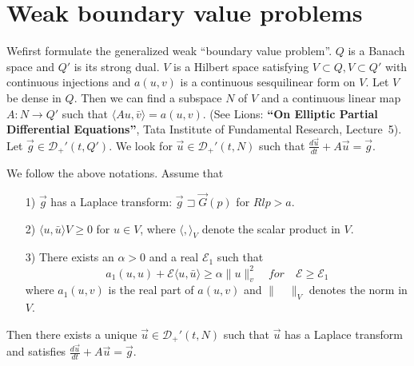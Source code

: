 
\chapter{Weak boundary value problems}\label{chap11}

\noindent We\pageoriginale first formulate the generalized weak
``boundary value problem''.
 $Q$ is a Banach space and $Q'$ is its
strong dual. $V$ is a Hilbert space satisfying $V\subset Q, V \subset
Q'$ with continuous injections and $a(u, v)$ is a continuous
sesquilinear form on $V$. Let $V$ be dense in $Q$. Then we can find a
subspace $N$ of $V$ and a continuous linear map $A : N \to Q'$ such
that $\langle Au, \bar{v}\rangle = a(u, v)$. (See Lions: {\bf``On
  Elliptic Partial Differential Equations''}, Tata Institute of
Fundamental Research, Lecture~5). Let $\overrightarrow{g} \in
\mathscr{D}_+'(t, Q')$. We look for $\overrightarrow{u} \in
\mathscr{D}_+'(t, N)$ such that $\frac{d\overrightarrow{u}}{dt}+
A\overrightarrow{u} = \overrightarrow{g}$. 
\setcounter{section}{11}
\setcounter{theorem}{0}
\begin{theorem}\label{chap11:thm11.1}
We follow the above notations. Assume that 
\begin{itemize}
\item [1)] $\overrightarrow{g}$ has a Laplace transform:
  $\overrightarrow{g}\sqsupset \overrightarrow{G} (p)$ for $Rl 
  p>a$.
\item [2)] $\langle u, \bar{u}\rangle V \geq 0$ for $u \in V$, where
  $\langle , \rangle_V$ denote the scalar product in $V$. 
\item [3)] There exists an $\alpha > 0$ and a real $\mathscr{E}_1$
  such that 
$$ 
a_1(u, u)+\mathscr{E} \langle u, \bar{u}\rangle \geq \alpha \parallel
u \parallel_v^2 \quad for \quad \mathscr{E} \geq \mathscr{E}_1
$$
where $a_1(u, v)$ is the real part of $a(u, v)$ and $\parallel \quad
\parallel_V$ denotes the norm in $V$. 
\end{itemize}

Then there exists a unique $\overrightarrow{u} \in \mathscr{D}_+'(t,
N)$ such that $\overrightarrow{u}$ has a Laplace transform and
satisfies $\frac{d\overrightarrow{u}}{dt}+ A
\overrightarrow{u} = \overrightarrow{g}$.
\end{theorem}

